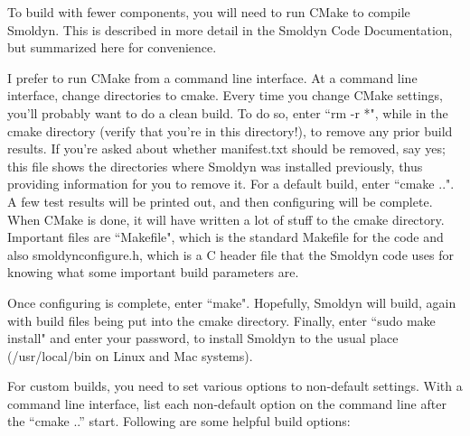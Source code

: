 \documentclass {book}
\begin{document}
To build with fewer components, you will need to run CMake to compile Smoldyn.  This is described in more detail in the Smoldyn Code Documentation, but summarized here for convenience.

I prefer to run CMake from a command line interface.  At a command line interface, change directories to cmake.  Every time you change CMake settings, you'll probably want to do a clean build.  To do so, enter ``rm -r *", while in the cmake directory (verify that you're in this directory!), to remove any prior build results.  If you're asked about whether manifest.txt should be removed, say yes; this file shows the directories where Smoldyn was installed previously, thus providing information for you to remove it.  For a default build, enter ``cmake ..".  A few test results will be printed out, and then configuring will be complete.  When CMake is done, it will have written a lot of stuff to the cmake directory.  Important files are ``Makefile", which is the standard Makefile for the code and also smoldynconfigure.h, which is a C header file that the Smoldyn code uses for knowing what some important build parameters are.

Once configuring is complete, enter ``make".  Hopefully, Smoldyn will build, again with build files being put into the cmake directory.  Finally, enter ``sudo make install" and enter your password, to install Smoldyn to the usual place (/usr/local/bin on Linux and Mac systems).

For custom builds, you need to set various options to non-default settings.  With a command line interface, list each non-default option on the command line after the ``cmake ..'' start.  Following are some helpful build options:
\end{document}
